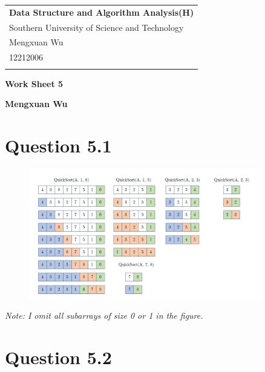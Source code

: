 \documentclass[a4paper,12pt]{article}
\begin{document}
\thispagestyle{empty} %

\begin{tabular}{p{15.5cm}}
{\large \bf Data Structure and Algorithm Analysis(H)} \\
Southern University of Science and Technology \\ Mengxuan Wu \\ 12212006 \\
\hline
\\
\end{tabular}

\vspace*{0.3cm} %

\begin{center}
	{\Large \bf Work Sheet 5}
	\vspace{2mm}

	{\bf Mengxuan Wu}
		
\end{center}  

\vspace{0.4cm}

\section*{Question 5.1}

\begin{figure}[H]
	\centering
	\includegraphics[width=0.9\textwidth]{Figure 1/幻灯片1.PNG}
\end{figure}

\textit{Note: I omit all subarrays of size 0 or 1 in the figure.}
\section*{Question 5.2}
\end{document}
